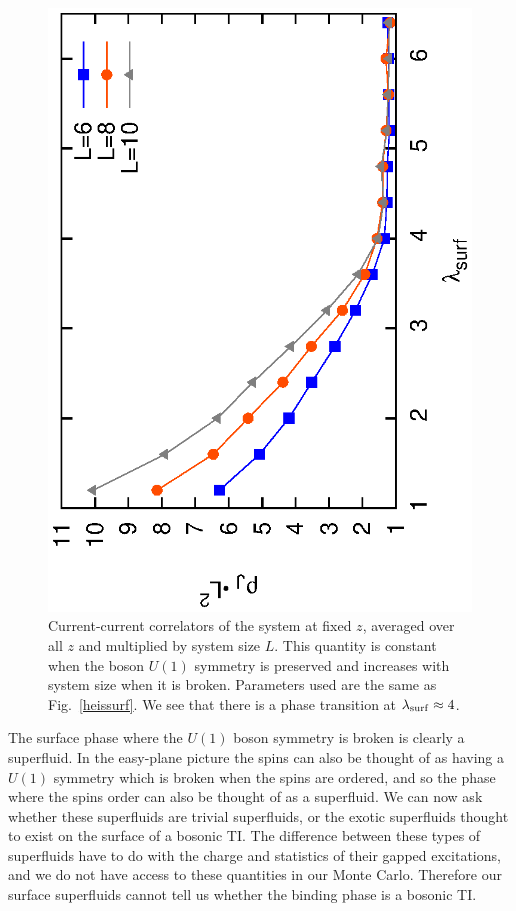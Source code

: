 \documentclass[prb,twocolumn]{revtex4-1}
\begin{document}
\begin{figure}
\includegraphics[angle=-90,width=0.9\linewidth]{figures/slabcurs.eps}
\caption{Current-current correlators of the system at fixed $z$, averaged over all $z$ and multiplied by system size $L$. This quantity is constant when the boson $U(1)$ symmetry is preserved and increases with system size when it is broken. Parameters used are the same as Fig.~\ref{heissurf}. We see that there is a phase transition at $\lambda_{\rm surf}\approx 4$.
}
\label{slabcurs}
\end{figure} 

The surface phase where the $U(1)$ boson symmetry is broken is clearly a superfluid. In the easy-plane picture the spins can also be thought of as having a $U(1)$ symmetry which is broken when the spins are ordered, and so the phase where the spins order can also be thought of as a superfluid. We can now ask whether these superfluids are trivial superfluids, or the exotic superfluids thought to exist on the surface of a bosonic TI.\cite{SenthilVishwanath} The difference between these types of superfluids have to do with the charge and statistics of their gapped excitations, and we do not have access to these quantities in our Monte Carlo. Therefore our surface superfluids cannot tell us whether the binding phase is a bosonic TI.
\end{document}
